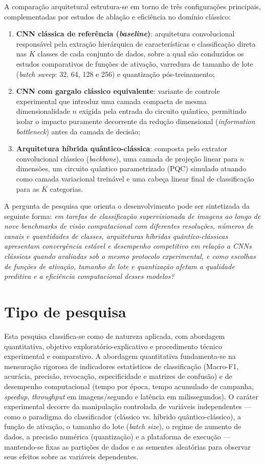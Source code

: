 \documentclass[
    12pt,
    openright,
    oneside,
    a4paper,
    english,
    brazil
]{abntex2}
\begin{document}
A comparação arquitetural estrutura-se em torno de três configurações principais, complementadas por estudos de ablação e eficiência no domínio clássico:
\begin{enumerate}
    \item \textbf{CNN clássica de referência (\textit{baseline})}: arquitetura convolucional responsável pela extração hierárquica de características e classificação direta nas \(K\) classes de cada conjunto de dados, sobre a qual são conduzidos os estudos comparativos de funções de ativação, varredura de tamanho de lote (\textit{batch sweep}: 32, 64, 128 e 256) e quantização pós-treinamento;
    \item \textbf{CNN com gargalo clássico equivalente}: variante de controle experimental que introduz uma camada compacta de mesma dimensionalidade \(n\) exigida pela entrada do circuito quântico, permitindo isolar o impacto puramente decorrente da redução dimensional (\textit{information bottleneck}) antes da camada de decisão;
    \item \textbf{Arquitetura híbrida quântico-clássica}: composta pelo extrator convolucional clássico (\textit{backbone}), uma camada de projeção linear para \(n\) dimensões, um circuito quântico parametrizado (PQC) simulado atuando como camada variacional treinável e uma cabeça linear final de classificação para as \(K\) categorias.
\end{enumerate}

A pergunta de pesquisa que orienta o desenvolvimento pode ser sintetizada da seguinte forma: \textit{em tarefas de classificação supervisionada de imagens ao longo de nove benchmarks de visão computacional com diferentes resoluções, números de canais e quantidades de classes, arquiteturas híbridas quântico-clássicas apresentam convergência estável e desempenho competitivo em relação a CNNs clássicas quando avaliadas sob o mesmo protocolo experimental, e como escolhas de funções de ativação, tamanho de lote e quantização afetam a qualidade preditiva e a eficiência computacional desses modelos?}

\section{Tipo de pesquisa}

Esta pesquisa classifica-se como de natureza aplicada, com abordagem quantitativa, objetivo exploratório-explicativo e procedimento técnico experimental e comparativo. A abordagem quantitativa fundamenta-se na mensuração rigorosa de indicadores estatísticos de classificação (Macro-F1, acurácia, precisão, revocação, especificidade e matrizes de confusão) e de desempenho computacional (tempo por época, tempo acumulado de campanha, \textit{speedup}, \textit{throughput} em imagens/segundo e latência em milissegundos). O caráter experimental decorre da manipulação controlada de variáveis independentes --- como o paradigma do classificador (clássico vs. híbrido quântico-clássico), a função de ativação, o tamanho do lote (\textit{batch size}), o regime de aumento de dados, a precisão numérica (quantização) e a plataforma de execução --- mantendo-se fixas as partições de dados e as sementes aleatórias para observar seus efeitos sobre as variáveis dependentes.
\end{document}
